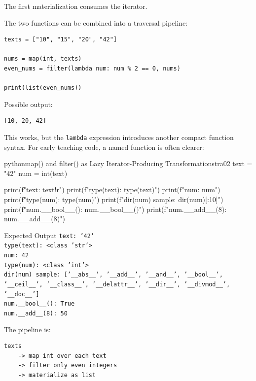 \documentclass[a4paper,twoside]{report}
\begin{document}
The first materialization consumes the iterator.

The two functions can be combined into a traversal pipeline:

\begin{verbatim}
texts = ["10", "15", "20", "42"]

nums = map(int, texts)
even_nums = filter(lambda num: num % 2 == 0, nums)

print(list(even_nums))
\end{verbatim}

Possible output:

\begin{verbatim}
[10, 20, 42]
\end{verbatim}

This works, but the \texttt{lambda} expression introduces another compact function syntax. For early teaching code, a named function is often clearer:

\begin{codebox}[]{python}{map() and filter() as Lazy Iterator-Producing Transformations}{tra02}
text = "42"
num = int(text)

print(f"text: {text!r}")
print(f"type(text): {type(text)}")
print(f"num: {num}")
print(f"type(num): {type(num)}")
print(f"dir(num) sample: {dir(num)[:10]}")
print(f"num.__bool__(): {num.__bool__()}")
print(f"num.__add__(8): {num.__add__(8)}")
\end{codebox}


\begin{iobox}{Expected Output}
\texttt{text: '42'} \\
\texttt{type(text): <class 'str'>} \\
\texttt{num: 42} \\
\texttt{type(num): <class 'int'>} \\
\texttt{dir(num) sample: ['\_\_abs\_\_', '\_\_add\_\_', '\_\_and\_\_', '\_\_bool\_\_',} \\
\texttt{'\_\_ceil\_\_', '\_\_class\_\_', '\_\_delattr\_\_', '\_\_dir\_\_', '\_\_divmod\_\_',} \\
\texttt{'\_\_doc\_\_']} \\
\texttt{num.\_\_bool\_\_(): True} \\
\texttt{num.\_\_add\_\_(8): 50} \\
\end{iobox}




The pipeline is:

\begin{verbatim}
texts
    -> map int over each text
    -> filter only even integers
    -> materialize as list
\end{verbatim}
\end{document}
